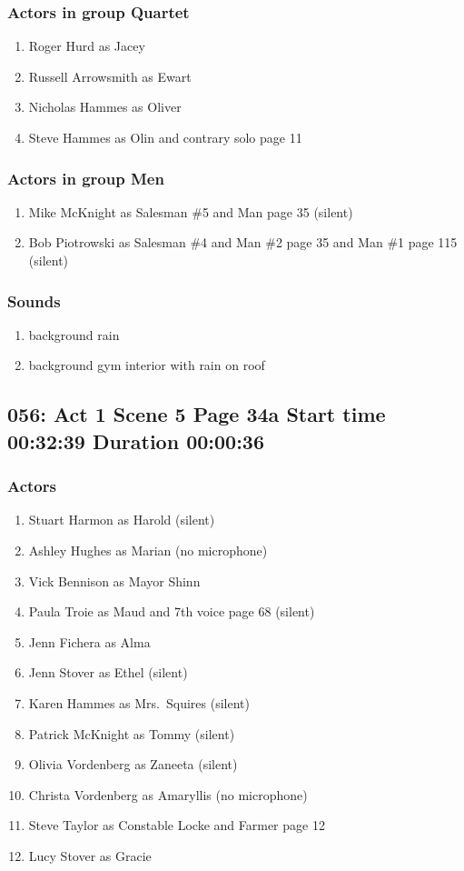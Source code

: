 \subsubsection{Actors in group Quartet}
\begin{enumerate}
\item Roger Hurd as Jacey
\item Russell Arrowsmith as Ewart
\item Nicholas Hammes as Oliver
\item Steve Hammes as Olin and contrary solo page 11
\end{enumerate}
\subsubsection{Actors in group Men}
\begin{enumerate}
\item Mike McKnight as Salesman \#5 and Man page 35 (silent)
\item Bob Piotrowski as Salesman \#4 and Man \#2 page 35 and Man \#1 page 115 (silent)
\end{enumerate}

\subsubsection{Sounds}
\begin{enumerate}
\item background rain
\item background gym interior with rain on roof
\end{enumerate}
\subsection{056: Act 1 Scene 5 Page 34a Start time 00:32:39 Duration 00:00:36}

\subsubsection{Actors}
\begin{enumerate}
\item Stuart Harmon as Harold (silent)
\item Ashley Hughes as Marian (no microphone)
\item Vick Bennison as Mayor Shinn
\item Paula Troie as Maud and 7th voice page 68 (silent)
\item Jenn Fichera as Alma
\item Jenn Stover as Ethel (silent)
\item Karen Hammes as Mrs.~Squires (silent)
\item Patrick McKnight as Tommy (silent)
\item Olivia Vordenberg as Zaneeta (silent)
\item Christa Vordenberg as Amaryllis (no microphone)
\item Steve Taylor as Constable Locke and Farmer page 12
\item Lucy Stover as Gracie
\end{enumerate}
